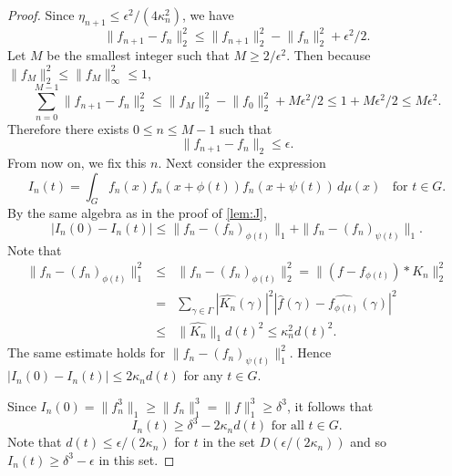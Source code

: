 \begin{proof}
		Since $\eta_{n+1} \leq \epsilon^2/(4 \kappa_n^2)$, we have
    \[
        \lVert f_{n+1} - f_n \rVert_2^2 \leq \lVert f_{n+1} \rVert_2^2 - \lVert f_n \rVert_2^2 + \epsilon^2/2.
    \]
     Let $M$ be the smallest integer such that $M \geq 2/\epsilon^2$. Then because $\lVert f_M \rVert_2^2 \leq \lVert f_M \rVert_{\infty}^2 \leq 1$,
    \[
        \sum_{n=0}^{M-1} \lVert f_{n+1} - f_n \rVert_2^2 \leq \lVert f_M \rVert_2^2 - \lVert f_0 \rVert_2^2 + M \epsilon^2/2 \leq 1 + M \epsilon^2/2 \leq M \epsilon^2.
    \]
    Therefore there exists $0 \leq n \leq M - 1$ such that
    \[
        \lVert f_{n+1} - f_n \rVert_2 \leq \epsilon.
    \]
    From now on, we fix this $n$.
    Next consider the expression
    \[
        I_n(t) = \int_G f_n(x) f_n(x+\phi(t)) f_n(x + \psi(t)) \, d \mu(x) \; \; \text{ for } t \in G.
    \]
    By the same algebra as in the proof of \cref{lem:J},
    \[
        |I_n(0) - I_n(t)| \leq \| f_n - (f_n)_{\phi(t)} \|_1 + \| f_n - (f_n)_{\psi(t)} \|_1. 			
    \]
	Note that
	\begin{eqnarray*}
		\| f_n - (f_n)_{\phi(t)} \|^2_1 &\leq & \| f_n - (f_n)_{\phi(t)} \|_2^2 = \| (f - f_{\phi(t)})*K_n \|_2^2 \\
		&=& \sum_{\gamma \in \Gamma} \left| \widehat{K_n}(\gamma) \right|^2 \left|\widehat{f}(\gamma) - \widehat{f_{\phi(t)}}(\gamma) \right|^2 \\
		&\leq & \| \widehat{K_n} \|_1 d(t)^2 \leq \kappa_n^2 d(t)^2.
		\end{eqnarray*}
		The same estimate holds for $\| f_n - (f_n)_{\psi(t)} \|_1^2$. Hence $|I_n(0) - I_n(t)| \leq 2 \kappa_n d(t)$ for any $t \in G$.
		
    Since $I_n(0) = \lVert f_n^3 \rVert_1 \geq \lVert f_n \rVert_1^3 = \lVert f \rVert_1^3 \geq \delta^3$, it follows that
    \[
        I_n(t) \geq \delta^3 - 2 \kappa_n d(t) \text{ for all } t \in G.
    \]
    Note that $d(t) \leq \epsilon/(2\kappa_n)$ for $t$ in the set $D(\epsilon/(2 \kappa_n))$ and so $I_n(t) \geq \delta^3 - \epsilon$ in this set. 
    
    

\end{proof}
